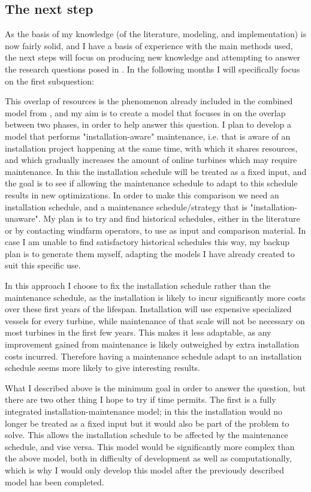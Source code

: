 \documentclass[a4paper,12pt]{article}
\begin{document}
\subsection{The next step}
As the basis of my knowledge (of the literature, modeling, and implementation) is now fairly solid, and I have a basis of experience with the main methods used, the next steps will focus on producing new knowledge and attempting to answer the research questions posed in . In the following months I will specifically focus on the first subquestion:

\sqa* 

This overlap of resources is the phenomenon already included in the combined model from , and my aim is to create a model that focuses in on the overlap between two phases, in order to help answer this question. I plan to develop a model that performs "installation-aware" maintenance, i.e. that is aware of an installation project happening at the same time, with which it shares resources, and which gradually increases the amount of online turbines which may require maintenance. In this the installation schedule will be treated as a fixed input, and the goal is to see if allowing the maintenance schedule to adapt to this schedule results in new optimizations. In order to make this comparison we need an installation schedule, and a maintenance schedule/strategy that is "installation-unaware". My plan is to try and find historical schedules, either in the literature or by contacting windfarm operators, to use as input and comparison material. In case I am unable to find satisfactory historical schedules this way, my backup plan is to generate them myself, adapting the models I have already created to suit this specific use. 

In this approach I choose to fix the installation schedule rather than the maintenance schedule, as the installation is likely to incur significantly more costs over these first years of the lifespan.  Installation will use expensive specialized vessels for every turbine, while maintenance of that scale will not be necessary on most turbines in the first few years. This makes it less adaptable, as any improvement gained from maintenance is likely outweighed by extra installation costs incurred. Therefore having a maintenance schedule adapt to an installation schedule seems more likely to give interesting results. 

\bigskip

What I described above is the minimum goal in order to answer the question, but there are two other thing I hope to try if time permits. The first is a fully integrated installation-maintenance model; in this the installation would no longer be treated as a fixed input but it would also be part of the problem to solve. This allows the installation schedule to be affected by the maintenance schedule, and vise versa. This model would be significantly more complex than the above model, both in difficulty of development as well as computationally, which is why I would only develop this model after the previously described model has been completed. 
\end{document}
